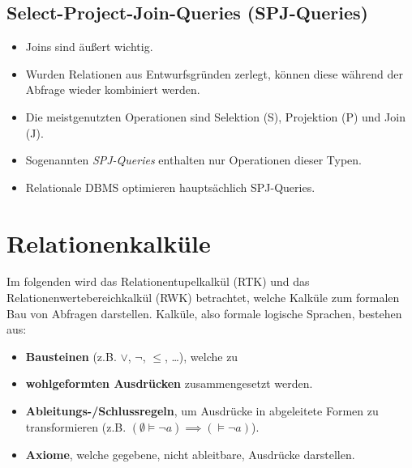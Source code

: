 		\subsection{Select-Project-Join-Queries (SPJ-Queries)} %
			\begin{itemize}
				\item Joins sind äußert wichtig.
				\item Wurden Relationen aus Entwurfsgründen zerlegt, können diese während der Abfrage wieder kombiniert werden.
				\item Die meistgenutzten Operationen sind Selektion (S), Projektion (P) und Join (J).
				\item Sogenannten \textit{SPJ-Queries} enthalten nur Operationen dieser Typen.
				\item Relationale DBMS optimieren hauptsächlich SPJ-Queries.
			\end{itemize}

	\section{Relationenkalküle} %
		Im folgenden wird das Relationentupelkalkül (RTK) und das Relationenwertebereichkalkül (RWK) betrachtet, welche Kalküle zum formalen Bau von Abfragen darstellen. Kalküle, also formale logische Sprachen, bestehen aus:
		\begin{itemize}
			\item \textbf{Bausteinen} (z.B. \(\lor\), \(\lnot\), \(\leq\), \dots), welche zu
			\item \textbf{wohlgeformten Ausdrücken} zusammengesetzt werden.
			\item \textbf{Ableitungs-/Schlussregeln}, um Ausdrücke in abgeleitete Formen zu transformieren (z.B. \( (\emptyset \models \lnot a) \implies (\models \lnot a) \)).
			\item \textbf{Axiome}, welche gegebene, nicht ableitbare, Ausdrücke darstellen.
		\end{itemize}

